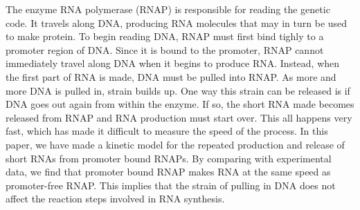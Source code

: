 The enzyme RNA polymerase (RNAP) is responsible for reading the genetic code.
It travels along DNA, producing RNA molecules that may in turn be used to make
protein. To begin reading DNA, RNAP must first bind tighly to a promoter
region of DNA. Since it is bound to the promoter, RNAP cannot immediately
travel along DNA when it begins to produce RNA. Instead, when the first part
of RNA is made, DNA must be pulled into RNAP. As more and more DNA is pulled
in, strain builds up. One way this strain can be released is if DNA goes out
again from within the enzyme. If so, the short RNA made becomes released from
RNAP and RNA production must start over. This all happens very fast, which has
made it difficult to measure the speed of the process. In this paper, we have
made a kinetic model for the repeated production and release of short RNAs
from promoter bound RNAPs. By comparing with experimental data, we find that
promoter bound RNAP makes RNA at the same speed as promoter-free RNAP. This
implies that the strain of pulling in DNA does not affect the reaction steps
involved in RNA synthesis.
